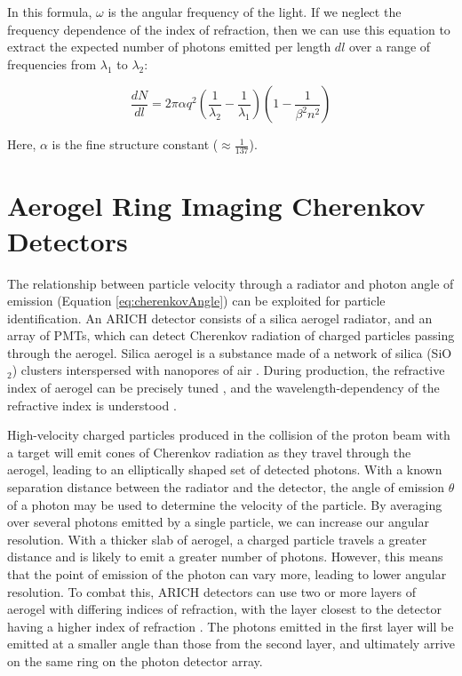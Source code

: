In this formula, $\omega$ is the angular frequency of the light.
If we neglect the frequency dependence of the index of refraction, then we can use this equation to extract the expected number of photons emitted per length $dl$ over a range of frequencies from $\lambda_1$ to $\lambda_2$:

\begin{equation}
    \label{eq:photonNumber}
    \frac{dN}{dl}  = 2\pi\alpha q^2 \left(\frac{1}{\lambda_2} - \frac{1}{\lambda_1}
    \right)\left(1 - \frac{1}{\beta^2n^2}\right)
\end{equation}

Here, $\alpha$ is the fine structure constant ($\approx \frac{1}{137}$).



\section{Aerogel Ring Imaging Cherenkov Detectors}
\label{sec:ARICH}
The relationship between particle velocity through a radiator and photon angle of emission (Equation \ref{eq:cherenkovAngle}) can be exploited for particle identification.
An \ac{ARICH} detector consists of a silica aerogel radiator, and an array of \ac{PMT}s, which can detect Cherenkov radiation of charged particles passing through the aerogel.
Silica aerogel is a substance made of a network of silica (SiO$_2$) clusters interspersed with nanopores of air \cite{aerogelRefraction}.
During production, the refractive index of aerogel can be precisely tuned \cite{aerogelRefraction}, and the wavelength-dependency of the refractive index is understood \cite{aerogelWavelength}. 

High-velocity charged particles produced in the collision of the proton beam with a target will emit cones of Cherenkov radiation as they travel through the aerogel, leading to an elliptically shaped set of detected photons.
With a known separation distance between the radiator and the detector, the angle of emission $\theta$ of a photon may be used to determine the velocity of the particle.
By averaging over several photons emitted by a single particle, we can increase our angular resolution.
With a thicker slab of aerogel, a charged particle travels a greater distance and is likely to emit a greater number of photons.
However, this means that the point of emission of the photon can vary more, leading to lower angular resolution.
To combat this, \ac{ARICH} detectors can use two or more layers of aerogel with differing indices of refraction, with the layer closest to the detector having a higher index of refraction \cite{belleArich}.
The photons emitted in the first layer will be emitted at a smaller angle than those from the second layer, and ultimately arrive on the same ring on the photon detector array.

